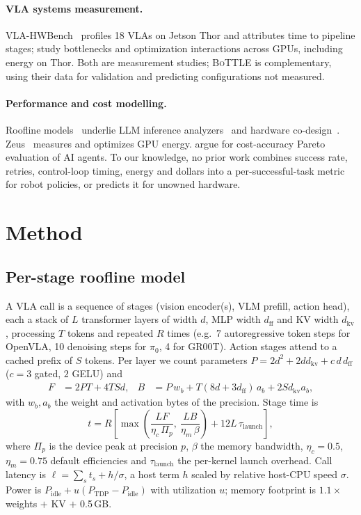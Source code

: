\documentclass[10pt]{article}
\newcommand{\bottle}{\textsc{BoTTLE}}
\begin{document}
\paragraph{VLA systems measurement.} VLA-HWBench~\citep{xu2026hwbench} profiles 18 VLAs on Jetson
Thor and attributes time to pipeline stages; \citet{waseem2026where} study bottlenecks and
optimization interactions across GPUs, including energy on Thor. Both are measurement studies;
\bottle{} is complementary, using their data for validation and predicting configurations not
measured.
\paragraph{Performance and cost modelling.} Roofline models~\citep{williams2009roofline} underlie
LLM inference analyzers~\citep{yuan2024llmviewer} and hardware co-design~\citep{sun2026codesign}.
Zeus~\citep{you2023zeus} measures and optimizes GPU energy. \citet{kapoor2024agents} argue for
cost-accuracy Pareto evaluation of AI agents. To our knowledge, no prior work combines success
rate, retries, control-loop timing, energy and dollars into a per-successful-task metric for
robot policies, or predicts it for unowned hardware.

\section{Method}\label{sec:method}
\subsection{Per-stage roofline model}
A VLA call is a sequence of stages (vision encoder(s), VLM prefill, action head), each a stack of
$L$ transformer layers of width $d$, MLP width $d_\text{ff}$ and KV width $d_\text{kv}$, processing
$T$ tokens and repeated $R$ times (e.g.\ 7 autoregressive token steps for OpenVLA, 10 denoising
steps for $\pi_0$, 4 for GR00T). Action stages attend to a cached prefix of $S$ tokens. Per layer we
count parameters $P = 2d^2 + 2dd_\text{kv} + c\,d\,d_\text{ff}$ ($c{=}3$ gated, $2$ GELU) and
\begin{align}
F &= 2PT + 4TSd, &
B &= P\,w_b + T(8d + 3d_\text{ff})\,a_b + 2Sd_\text{kv}a_b,
\end{align}
with $w_b,a_b$ the weight and activation bytes of the precision. Stage time is
\begin{equation}
t = R\left[\max\!\left(\frac{LF}{\eta_c\,\Pi_p},\ \frac{LB}{\eta_m\,\beta}\right) + 12L\,\tau_\text{launch}\right],
\end{equation}
where $\Pi_p$ is the device peak at precision $p$, $\beta$ the memory bandwidth, $\eta_c{=}0.5$,
$\eta_m{=}0.75$ default efficiencies and $\tau_\text{launch}$ the per-kernel launch overhead. Call
latency is $\ell = \sum_s t_s + h/\sigma$, a host term $h$ scaled by relative host-CPU speed
$\sigma$. Power is $P_\text{idle} + u(P_\text{TDP}-P_\text{idle})$ with utilization $u$; memory
footprint is $1.1\times$ weights $+$ KV $+$ 0.5\,GB.
\end{document}
